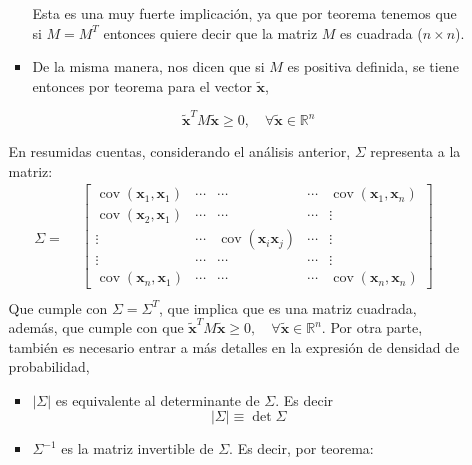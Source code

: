 \begin{problema}
\begin{enumerate}
\begin{sol}
\begin{enumerate}
\begin{itemize}
\begin{cajita}
    Esta es una muy fuerte implicación, ya que por teorema tenemos que si $M=M^T$ entonces quiere decir que la matriz $M$ es cuadrada ($n\times n$). 
\end{cajita}
\item De la misma manera, nos dicen que si $M$ es positiva definida, se tiene entonces por teorema para el vector  $\tilde{\boldsymbol{x}}$, 

$$\tilde{\boldsymbol{x}}^T M \tilde{\boldsymbol{x}} \geq 0, \quad \forall  \tilde{\boldsymbol{x}}\in \mathbb{R}^n$$
            \end{itemize}
            En resumidas cuentas, considerando el análisis anterior, $\Sigma$ representa a la matriz: 
            $$\Sigma =
            \begin{aligned}
            & \left[\begin{array}{ccccc}
                \operatorname{cov}(\boldsymbol{x}_1,\boldsymbol{x}_1) & \cdots & \cdots & \cdots & \operatorname{cov}(\boldsymbol{x}_1 ,\boldsymbol{x}_n) \\
                \operatorname{cov}(\boldsymbol{x}_2,\boldsymbol{x}_1) & \cdots & \cdots & \cdots & \vdots \\
            \vdots & \cdots & \operatorname{cov}(\boldsymbol{x}_i \boldsymbol{x}_j) & \cdots & \vdots \\
            \vdots & \cdots & \cdots & \cdots & \vdots \\
            \operatorname{cov}(\boldsymbol{x}_n,\boldsymbol{x}_1) & \cdots & \cdots & \cdots & \operatorname{cov}(\boldsymbol{x}_n,\boldsymbol{x}_n)
            \end{array}\right] \\
            &
            \end{aligned}
            $$
            Que cumple con $\Sigma = \Sigma^T$, que implica que es una matriz cuadrada, además, que cumple con que  $\tilde{\boldsymbol{x}}^T M \tilde{\boldsymbol{x}} \geq 0, \quad \forall  \tilde{\boldsymbol{x}}\in \mathbb{R}^n$. Por otra parte, también es necesario entrar a más detalles en la expresión de densidad de probabilidad, 
            \begin{itemize}
                \item $\left|\Sigma\right|$ es equivalente al determinante de $\Sigma$. Es decir 
                $$\left|\Sigma\right| \equiv \det \Sigma $$
                \item $\Sigma^{-1}$ es la matriz invertible de $\Sigma$. Es decir, por teorema: 

\end{itemize}
\end{enumerate}
\end{sol}
\end{enumerate}
\end{problema}
